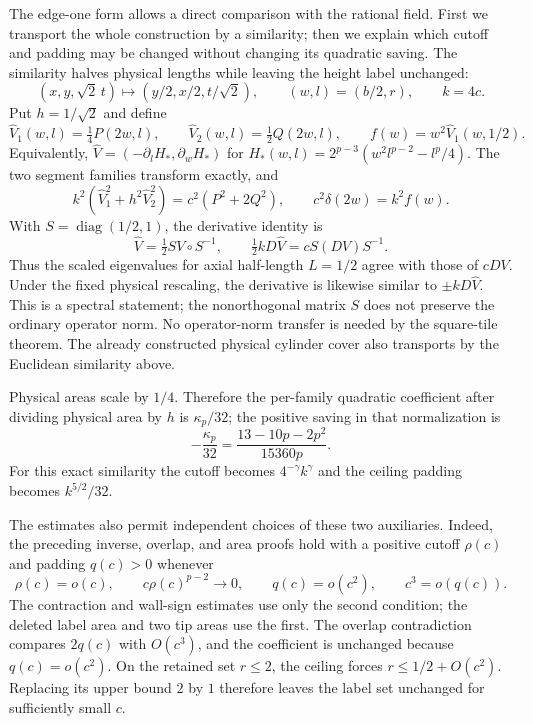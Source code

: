 The edge-one form allows a direct comparison with the rational field.
First we transport the whole construction by a similarity; then we explain
which cutoff and padding may be changed without changing its quadratic
saving.  The similarity halves physical lengths while leaving the height
label unchanged:
\[
 (x,y,\sqrt{2}\,t)\longmapsto(y/2,x/2,t/\sqrt{2}),
 \qquad (w,l)=(b/2,r),\qquad k=4c.
\]
Put $h=1/\sqrt{2}$ and define
\[
 \widehat V_1(w,l)=\tfrac14P(2w,l),\qquad
 \widehat V_2(w,l)=\tfrac12Q(2w,l),\qquad
 f(w)=w^2\widehat V_1(w,1/2).
\]
Equivalently, $\widehat V=(-\partial_lH_*,\partial_wH_*)$ for
$H_*(w,l)=2^{p-3}(w^2l^{p-2}-l^{p}/4)$.
The two segment families transform exactly, and
\[
 k^2(\widehat V_1^2+h^2\widehat V_2^2)
     =c^2(P^2+2Q^2),\qquad
 c^2\delta(2w)=k^2 f(w).
\]
With $S=\operatorname{diag}(1/2,1)$, the derivative identity is
\[
 \widehat V=\tfrac12 S V\circ S^{-1},\qquad
 \tfrac12 kD\widehat V=cS(DV)S^{-1}.
\]
Thus the scaled eigenvalues for axial half-length $L=1/2$ agree
with those of $cDV$.  Under the fixed physical rescaling, the derivative is likewise
similar to $\pm kD\widehat V$.
This is a spectral statement; the nonorthogonal matrix $S$ does not
preserve the ordinary operator norm. No operator-norm transfer is needed
by the square-tile theorem. The already constructed physical cylinder
cover also transports by the Euclidean similarity above.

Physical areas scale by $1/4$.  Therefore the per-family quadratic
coefficient after dividing physical area by $h$ is $\kappa_p/32$;
the positive saving in that normalization is
\[
 -\frac{\kappa_p}{32}
   =\frac{13-10p-2p^2}{15360p}.
\]
For this exact similarity the cutoff becomes $4^{-\gamma}k^\gamma$
and the ceiling padding becomes $k^{5/2}/32$.

The estimates also permit independent choices of these two auxiliaries.
Indeed, the preceding inverse, overlap, and area proofs hold with a
positive cutoff $\rho(c)$ and padding $q(c)>0$ whenever
\begin{equation}
 \rho(c)=o(c),\qquad c\rho(c)^{p-2}\longrightarrow0,
 \qquad q(c)=o(c^2),\qquad c^3=o(q(c)).
 \label{c:sing-cutoff-flexibility}
\end{equation}
The contraction and wall-sign estimates use only the second condition;
the deleted label area and two tip areas use the first.  The overlap
contradiction compares $2q(c)$ with $O(c^3)$, and the coefficient is
unchanged because $q(c)=o(c^2)$.  On the retained set $r\le2$, the
ceiling forces $r\le1/2+O(c^2)$.  Replacing its upper bound $2$ by
$1$ therefore leaves the label set unchanged for sufficiently small $c$.


